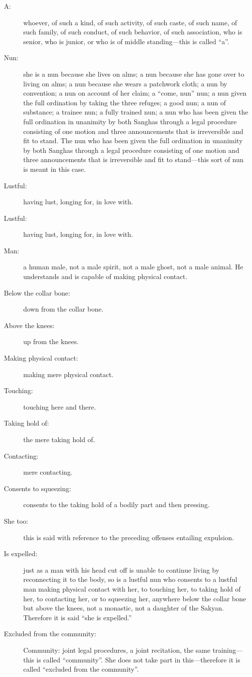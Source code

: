 \documentclass[12pt,openany]{book}%
\begin{document}
\begin{description}%
\item[A: ] whoever, of such a kind, of such activity, of such caste, of such name, of such family, of such conduct, of such behavior, of such association, who is senior, who is junior, or who is of middle standing—this is called “a”. %
\item[Nun: ] she is a nun because she lives on alms; a nun because she has gone over to living on alms; a nun because she wears a patchwork cloth; a nun by convention; a nun on account of her claim; a “come, nun” nun; a nun given the full ordination by taking the three refuges; a good nun; a nun of substance; a trainee nun; a fully trained nun; a nun who has been given the full ordination in unanimity by both Sanghas through a legal procedure consisting of one motion and three announcements that is irreversible and fit to stand. The nun who has been given the full ordination in unanimity by both Sanghas through a legal procedure consisting of one motion and three announcements that is irreversible and fit to stand—this sort of nun is meant in this case. %
\item[Lustful: ] having lust, longing for, in love with. %
\item[Lustful: ] having lust, longing for, in love with. %
\item[Man: ] a human male, not a male spirit, not a male ghost, not a male animal. He understands and is capable of making physical contact. %
\item[Below the collar bone: ] down from the collar bone. %
\item[Above the knees: ] up from the knees. %
\item[Making physical contact: ] making mere physical contact. %
\item[Touching: ] touching here and there. %
\item[Taking hold of: ] the mere taking hold of. %
\item[Contacting: ] mere contacting. %
\item[Consents to squeezing: ] consents to the taking hold of a bodily part and then pressing. %
\item[She too: ] this is said with reference to the preceding offenses entailing expulsion. %
\item[Is expelled: ] just as a man with his head cut off is unable to continue living by reconnecting it to the body, so is a lustful nun who consents to a lustful man making physical contact with her, to touching her, to taking hold of her, to contacting her, or to squeezing her, anywhere below the collar bone but above the knees, not a monastic, not a daughter of the Sakyan. Therefore it is said “she is expelled.” %
\item[Excluded from the community: ] Community: joint legal procedures, a joint recitation, the same training—this is called “community”. She does not take part in this—therefore it is called “excluded from the community”. %
\end{description}
\end{document}
